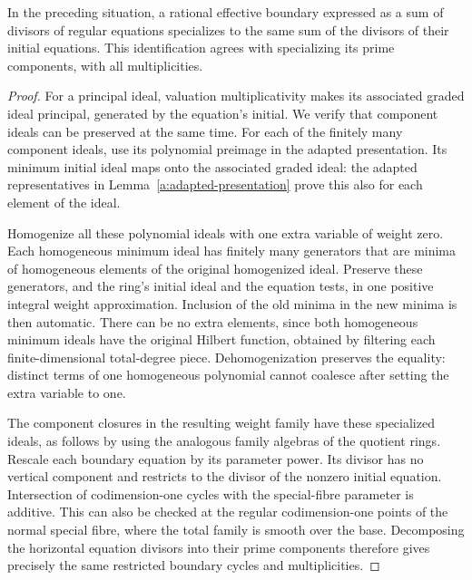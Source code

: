 \begin{lemma}
\label{a:boundary-specialization}
In the preceding situation, a rational effective boundary expressed as
a sum of divisors of regular equations specializes to the same sum of
the divisors of their initial equations. This identification agrees with
specializing its prime components, with all multiplicities.
\end{lemma}

\begin{proof}
For a principal ideal, valuation multiplicativity makes its associated
graded ideal principal, generated by the equation's initial. We verify
that component ideals can be preserved at the same time. For each of
the finitely many component ideals, use its polynomial preimage in the
adapted presentation. Its minimum initial ideal maps onto the associated
graded ideal: the adapted representatives in
Lemma~\ref{a:adapted-presentation} prove this also for each element of
the ideal.

Homogenize all these polynomial ideals with one extra variable of
weight zero. Each homogeneous minimum ideal has finitely many generators
that are minima of homogeneous elements of the original homogenized
ideal. Preserve these generators, and the ring's initial ideal and the
equation tests, in one positive integral weight approximation. Inclusion
of the old minima in the new minima is then automatic. There can be no
extra elements, since both homogeneous minimum ideals have the original
Hilbert function, obtained by filtering each finite-dimensional
total-degree piece. Dehomogenization preserves the equality: distinct
terms of one homogeneous polynomial cannot coalesce after setting the
extra variable to one.

The component closures in the resulting weight family have these
specialized ideals, as follows by using the analogous family algebras of
the quotient rings. Rescale each boundary equation by its parameter
power. Its divisor has no vertical component and restricts to the
divisor of the nonzero initial equation. Intersection of codimension-one
cycles with the special-fibre parameter is additive. This can also be
checked at the regular codimension-one points of the normal special
fibre, where the total family is smooth over the base. Decomposing the
horizontal equation divisors into their prime components therefore gives
precisely the same restricted boundary cycles and multiplicities.
\end{proof}

